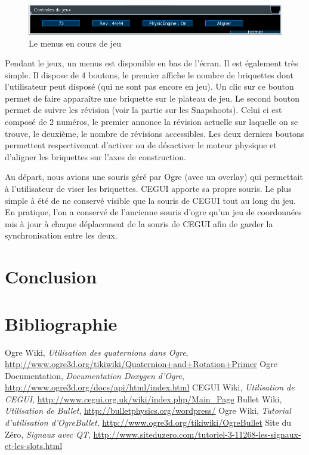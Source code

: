 \documentclass[frenchb,twoside]{EPURapport}
\begin{document}
		\begin{figure}[h]
			\centering
			\includegraphics[scale=0.75]{images/menu_jeu.png}
			\caption{\label{fig:menu_jeu}Le menus en cours de jeu}
		\end{figure}      
        Pendant le jeux, un menus est disponible en bas de l'écran. Il est
        également très simple. Il dispose de 4 boutons, le premier affiche le
        nombre de briquettes dont l'utilisateur peut disposé (qui ne sont pas
        encore en jeu). Un clic sur ce bouton permet de faire apparaître une
        briquette sur le plateau de jeu. Le second bouton permet de suivre les
        révision (voir la partie sur les Snapshoots). Celui ci est composé de 2
        numéros, le premier annonce la révision actuelle sur laquelle on se
        trouve, le deuxième, le nombre de révisions accessibles. Les deux
        derniers boutons permettent respectivemnt d'activer ou de désactiver le
        moteur physique et d'aligner les briquettes sur l'axes de construction.

        Au départ, nous avions une souris géré par Ogre (avec un overlay) qui
        permettait à l'utilisateur de viser les briquettes. CEGUI apporte sa
        propre souris. Le plus simple à été de ne conservé visible que la
        souris de CEGUI tout au long du jeu. En pratique, l'on a conservé de
        l'ancienne souris d'ogre qu'un jeu de coordonnées mis à jour à chaque
        déplacement de la souris de CEGUI afin de garder la synchronisation
        entre les deux.
\chapter{Conclusion}




\chapter{Bibliographie}

\begin{bibliographie}	
	 Ogre Wiki, \textit{Utilisation des quaternions dans Ogre}, \url{http://www.ogre3d.org/tikiwiki/Quaternion+and+Rotation+Primer}
	 Ogre Documentation, \textit{Documentation Doxygen d'Ogre}, \url{http://www.ogre3d.org/docs/api/html/index.html}
	 CEGUI Wiki, \textit{Utilisation de CEGUI}, \url{http://www.cegui.org.uk/wiki/index.php/Main_Page}
	 Bullet Wiki, \textit{Utilisation de Bullet}, \url{http://bulletphysics.org/wordpress/}
	 Ogre Wiki, \textit{Tutorial d'utilisation d'OgreBullet}, \url{http://www.ogre3d.org/tikiwiki/OgreBullet}
	 Site du Zéro, \textit{Signaux avec QT}, \url{http://www.siteduzero.com/tutoriel-3-11268-les-signaux-et-les-slots.html}
	\end{bibliographie}	
\end{document}
